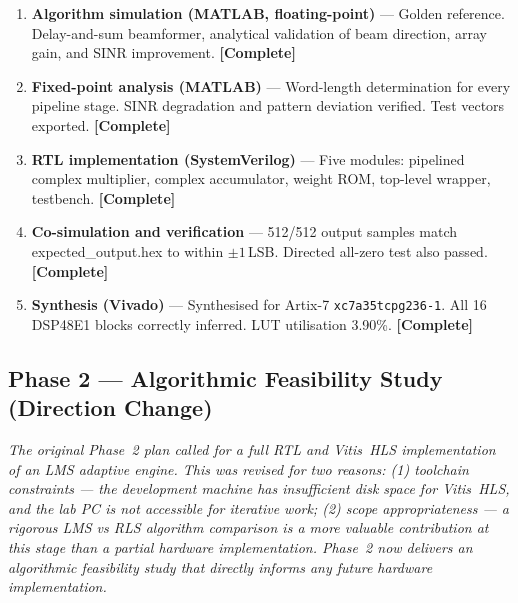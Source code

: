 \documentclass[11pt,a4paper]{article}
\begin{document}
\begin{enumerate}[leftmargin=2em, label=\textbf{1.\arabic*.}]
    \item \textbf{Algorithm simulation (MATLAB, floating-point)} ---
          Golden reference. Delay-and-sum beamformer, analytical validation
          of beam direction, array gain, and SINR improvement.
          \textcolor{passgreen}{\textbf{[Complete]}}

    \item \textbf{Fixed-point analysis (MATLAB)} ---
          Word-length determination for every pipeline stage. SINR
          degradation and pattern deviation verified. Test vectors exported.
          \textcolor{passgreen}{\textbf{[Complete]}}

    \item \textbf{RTL implementation (SystemVerilog)} ---
          Five modules: pipelined complex multiplier, complex accumulator,
          weight ROM, top-level wrapper, testbench.
          \textcolor{passgreen}{\textbf{[Complete]}}

    \item \textbf{Co-simulation and verification} ---
          512/512 output samples match expected\_output.hex to within
          $\pm1$\,LSB. Directed all-zero test also passed.
          \textcolor{passgreen}{\textbf{[Complete]}}

    \item \textbf{Synthesis (Vivado)} ---
          Synthesised for Artix-7 \texttt{xc7a35tcpg236-1}. All 16 DSP48E1
          blocks correctly inferred. LUT utilisation 3.90\%.
          \textcolor{passgreen}{\textbf{[Complete]}}
\end{enumerate}

\subsection{Phase 2 --- Algorithmic Feasibility Study (Direction Change)}

\textit{The original Phase~2 plan called for a full RTL and Vitis~HLS
implementation of an LMS adaptive engine. This was revised for two reasons:
(1) toolchain constraints --- the development machine has insufficient disk
space for Vitis~HLS, and the lab PC is not accessible for iterative work;
(2) scope appropriateness --- a rigorous LMS vs RLS algorithm comparison
is a more valuable contribution at this stage than a partial hardware
implementation. Phase~2 now delivers an algorithmic feasibility study
that directly informs any future hardware implementation.}
\end{document}

